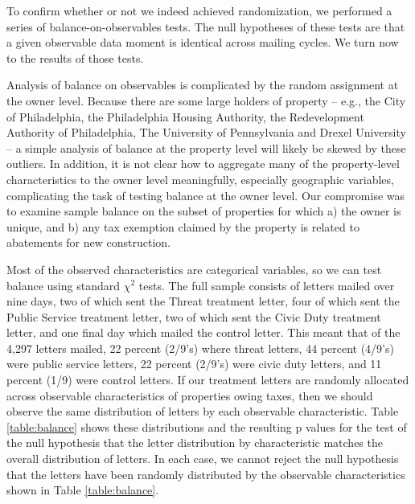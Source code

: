 \documentclass[12pt,titlepage]{article}
\begin{document}
To confirm whether or not we indeed achieved randomization, we
performed a series of balance-on-observables tests. The null
hypotheses of these tests are that a given observable data moment is
identical across mailing cycles. We turn now to the results of those
tests.

Analysis of balance on observables is complicated by the random
assignment at the owner level.  Because there are some large holders
of property -- e.g., the City of Philadelphia, the Philadelphia
Housing Authority, the Redevelopment Authority of Philadelphia, The
University of Pennsylvania and Drexel University -- a simple analysis
of balance at the property level will likely be skewed by these
outliers. In addition, it is not clear how to aggregate many of the
property-level characteristics to the owner level meaningfully,
especially geographic variables, complicating the task of testing
balance at the owner level. Our compromise was to examine sample
balance on the subset of properties for which a) the owner is unique,
and b) any tax exemption claimed by the property is related to
abatements for new construction.
  
Most of the observed characteristics are categorical variables, so we
can test balance using standard $\chi^2$ tests. The full sample
consists of letters mailed over nine days, two of which sent the
Threat treatment letter, four of which sent the Public Service
treatment letter, two of which sent the Civic Duty treatment letter,
and one final day which mailed the control letter.  This meant that of
the 4,297 letters mailed, 22 percent (2/9's) where threat letters, 44
percent (4/9's) were public service letters, 22 percent (2/9's) were
civic duty letters, and 11 percent (1/9) were control letters.  If our
treatment letters are randomly allocated across observable
characteristics of properties owing taxes, then we should observe the
same distribution of letters by each observable characteristic.  Table
\ref{table:balance} shows these distributions and the resulting p
values for the test of the null hypothesis that the letter
distribution by characteristic matches the overall distribution of
letters.  In each case, we cannot reject the null hypothesis that the
letters have been randomly distributed by the observable
characteristics shown in Table \ref{table:balance}.
\end{document}
